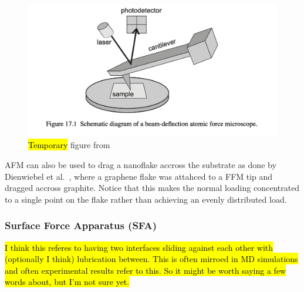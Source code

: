 \begin{figure}[H]
  \centering
  \includegraphics[width=0.6\linewidth]{figures/theory/AFM.png}
  \caption{\hl{Temporary} figure from \cite[p. 184]{gnecco_meyer_2015}}
  \label{fig:AFM}
\end{figure}


\acrshort{AFM} can also be used to drag a nanoflake accross the substrate as done by
Dienwiebel et al.\ \cite{DIENWIEBEL2005197}, where a graphene flake was attahced
to a \acrshort{FFM} tip and dragged accross graphite. Notice that this makes the normal
loading concentrated to a single point on the flake rather than achieving an evenly distributed load. 



\subsubsection{Surface Force Apparatus (SFA)}

\hl{I think this referes to having two interfaces sliding against each other with (optionally I think) lubrication between. This is often mirroed in MD simulations and often experimental results refer to this. So it might be worth saying a few words about, but I'm not sure yet.}












